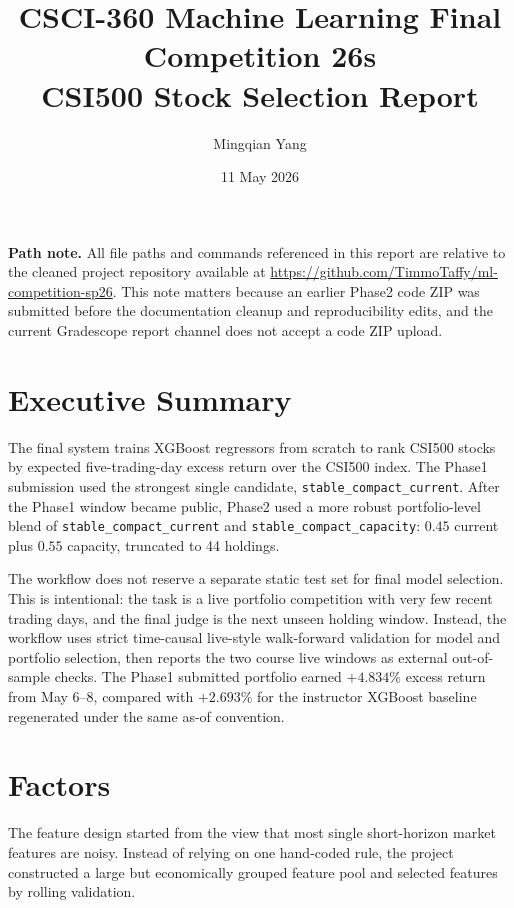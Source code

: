 \documentclass[11pt]{article}
\title{CSCI-360 Machine Learning Final Competition 26s \\ CSI500 Stock Selection Report}
\author{Mingqian Yang}
\date{11 May 2026}
\begin{document}
\maketitle

\noindent\textbf{Path note.} All file paths and commands referenced in this
report are relative to the cleaned project repository available at
\url{https://github.com/TimmoTaffy/ml-competition-sp26}. This note matters
because an earlier Phase2 code ZIP was submitted before the documentation
cleanup and reproducibility edits, and the current Gradescope report channel
does not accept a code ZIP upload.

\section*{Executive Summary}

The final system trains XGBoost regressors from scratch to rank CSI500 stocks
by expected five-trading-day excess return over the CSI500 index. The Phase1
submission used the strongest single candidate, \texttt{stable\_compact\_current}.
After the Phase1 window became public, Phase2 used a more robust
portfolio-level blend of \texttt{stable\_compact\_current} and
\texttt{stable\_compact\_capacity}: \(0.45\) current plus \(0.55\) capacity,
truncated to 44 holdings.

The workflow does not reserve a separate static test set for final model selection. This is
intentional: the task is a live portfolio competition with very few recent
trading days, and the final judge is the next unseen holding window. Instead,
the workflow uses strict time-causal live-style walk-forward validation for
model and portfolio selection, then reports the two course live windows as
external out-of-sample checks. The Phase1 submitted portfolio earned
\(+4.834\%\) excess return from May 6--8, compared with \(+2.693\%\) for the
instructor XGBoost baseline regenerated under the same as-of convention.

\clearpage

\section{Factors}

The feature design started from the view that most single short-horizon market
features are noisy. Instead of relying on one hand-coded rule, the project
constructed a large but economically grouped feature pool and selected features
by rolling validation.
\end{document}
